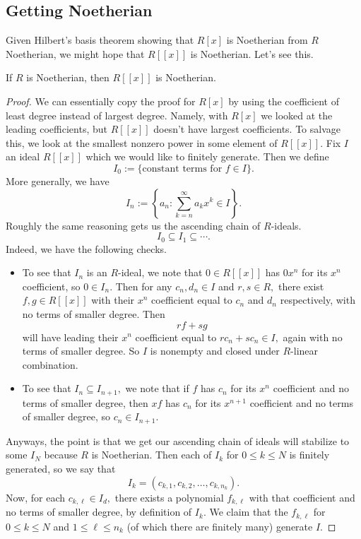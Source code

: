 \documentclass[../notes.tex]{subfiles}
\begin{document}
\subsection{Getting Noetherian}
Given Hilbert's basis theorem showing that $R[x]$ is Noetherian from $R$ Noetherian, we might hope that $R[[x]]$ is Noetherian. Let's see this.
\begin{theorem}
	If $R$ is Noetherian, then $R[[x]]$ is Noetherian.
\end{theorem}
\begin{proof}
	We can essentially copy the proof for $R[x]$ by using the coefficient of least degree instead of largest degree. Namely, with $R[x]$ we looked at the leading coefficients, but $R[[x]]$ doesn't have largest coefficients. To salvage this, we look at the smallest nonzero power in some element of $R[[x]].$ Fix $I$ an ideal $R[[x]]$ which we would like to finitely generate. Then we define
	\[I_0:=\{\text{constant terms for }f\in I\}.\]
	More generally, we have
	\[I_n:=\left\{a_n:\sum_{k=n}^\infty a_kx^k\in I\right\}.\]
	Roughly the same reasoning gets us the ascending chain of $R$-ideals.
	\[I_0\subseteq I_1\subseteq\cdots.\]
	Indeed, we have the following checks.
	\begin{itemize}
		\item To see that $I_n$ is an $R$-ideal, we note that $0\in R[[x]]$ has $0x^n$ for its $x^n$ coefficient, so $0\in I_n.$ Then for any $c_n,d_n\in I$ and $r,s\in R,$ there exist $f,g\in R[[x]]$ with their $x^n$ coefficient equal to $c_n$ and $d_n$ respectively, with no terms of smaller degree. Then
		\[rf+sg\]
		will have leading their $x^n$ coefficient equal to $rc_n+sc_n\in I,$ again with no terms of smaller degree. So $I$ is nonempty and closed under $R$-linear combination.
		\item To see that $I_n\subseteq I_{n+1},$ we note that if $f$ has $c_n$ for its $x^n$ coefficient and no terms of smaller degree, then $xf$ has $c_n$ for its $x^{n+1}$ coefficient and no terms of smaller degree, so $c_n\in I_{n+1}.$
	\end{itemize}
	Anyways, the point is that we get our ascending chain of ideals will stabilize to some $I_N$ because $R$ is Noetherian. Then each of $I_k$ for $0\le k\le N$ is finitely generated, so we say that
	\[I_k=(c_{k,1},c_{k,2},\ldots,c_{k,n_k}).\]
	Now, for each $c_{k,\ell}\in I_d,$ there exists a polynomial $f_{k,\ell}$ with that coefficient and no terms of smaller degree, by definition of $I_k.$ We claim that the $f_{k,\ell}$ for $0\le k\le N$ and $1\le\ell\le n_k$ (of which there are finitely many) generate $I.$


\end{proof}
\end{document}
